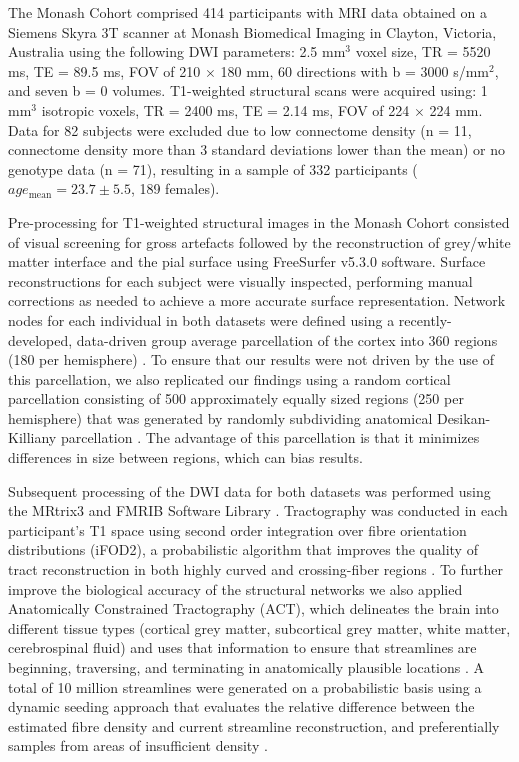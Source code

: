 The Monash Cohort comprised 414 participants with MRI data obtained on a Siemens Skyra 3T scanner at Monash Biomedical Imaging in Clayton, Victoria, Australia using the following DWI parameters: 2.5 mm$^{3}$ voxel size, TR = 5520 ms, TE = 89.5 ms, FOV of 210 $\times$ 180 mm, 60 directions with b = 3000 s/mm$^{2}$, and seven b = 0 volumes. T1-weighted structural scans were acquired using: 1 mm$^{3}$ isotropic voxels, TR = 2400 ms, TE = 2.14 ms, FOV of 224 $\times$ 224 mm. Data for 82 subjects were excluded due to low connectome density (n = 11, connectome density more than 3 standard deviations lower than the mean) or no genotype data (n = 71), resulting in a sample of 332 participants ($age_\mathrm{mean} = 23.7 \pm 5.5$, 189 females).

Pre-processing for T1-weighted structural images in the Monash Cohort consisted of visual screening for gross artefacts followed by the reconstruction of grey/white matter interface and the pial surface using FreeSurfer v5.3.0 software. Surface reconstructions for each subject were visually inspected, performing manual corrections as needed to achieve a more accurate surface representation. Network nodes for each individual in both datasets were defined using a recently-developed, data-driven group average parcellation of the cortex into 360 regions (180 per hemisphere) \citep{Glasser2016}. To ensure that our results were not driven by the use of this parcellation, we also replicated our findings using a random cortical parcellation consisting of 500 approximately equally sized regions (250 per hemisphere) that was generated by randomly subdividing anatomical Desikan-Killiany parcellation \citep{Desikan2006}. The advantage of this parcellation is that it minimizes differences in size between regions, which can bias results.

Subsequent processing of the DWI data for both datasets was performed using the MRtrix3 \citep{Tournier2012} and FMRIB Software Library \citep{Jenkinson2012}. Tractography was conducted in each participant's T1 space using second order integration over fibre orientation distributions (iFOD2), a probabilistic algorithm that improves the quality of tract reconstruction in both highly curved and crossing-fiber regions \citep{Tournier2010}. To further improve the biological accuracy of the structural networks we also applied Anatomically Constrained Tractography (ACT), which delineates the brain into different tissue types (cortical grey matter, subcortical grey matter, white matter, cerebrospinal fluid) and uses that information to ensure that streamlines are beginning, traversing, and terminating in anatomically plausible locations \citep{Smith2012}. A total of 10 million streamlines were generated on a probabilistic basis using a dynamic seeding approach that evaluates the relative difference between the estimated fibre density and current streamline reconstruction, and preferentially samples from areas of insufficient density \citep{Smith2015a}.

